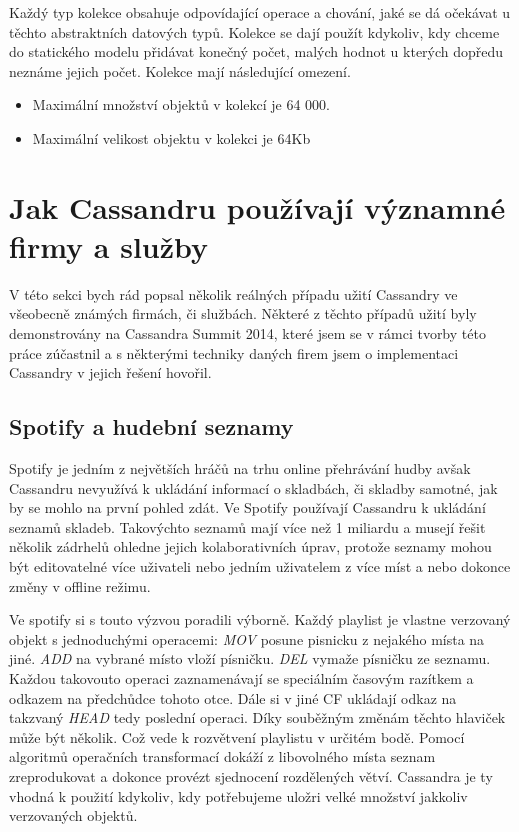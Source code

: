 \documentclass[thesis=M,czech]{FITthesis}[2012/06/26]
\begin{document}
Každý typ kolekce obsahuje odpovídající operace a  chování, jaké se dá očekávat u těchto abstraktních datových typů. Kolekce se dají použít kdykoliv, kdy chceme do statického modelu přidávat konečný počet, malých hodnot u kterých dopředu neznáme jejich počet. Kolekce mají následující omezení. 

\begin{itemize}
\item Maximální množství objektů v kolekcí je 64 000.
\item Maximální velikost objektu v kolekci je 64Kb
\end{itemize}

\section{Jak Cassandru používají významné firmy a služby}

V této sekci bych rád popsal několik reálných případu užití Cassandry ve všeobecně známých firmách, či službách. Některé z těchto případů užití byly demonstrovány na Cassandra Summit 2014, které jsem se v rámci tvorby této práce zúčastnil a s některými techniky daných firem jsem o implementaci Cassandry v jejich řešení hovořil. 

\subsection{Spotify a hudební seznamy}
Spotify je jedním z největších hráčů na trhu online přehrávání hudby avšak Cassandru nevyužívá k ukládání informací o skladbách, či skladby samotné, jak by se mohlo na první pohled zdát. Ve Spotify používají Cassandru k ukládání seznamů skladeb. Takovýchto seznamů mají více než 1 miliardu a musejí řešit několik zádrhelů ohledne jejich kolaborativních úprav, protože seznamy mohou být editovatelné více uživateli nebo jedním uživatelem z více míst a nebo dokonce změny v offline režimu. 

Ve spotify si s touto výzvou poradili výborně. Každý playlist je vlastne verzovaný objekt s jednoduchými operacemi: \emph{MOV} posune pisnicku z nejakého místa na jiné. \emph{ADD} na vybrané místo vloží písničku. \emph{DEL} vymaže písničku ze seznamu. Každou takovouto operaci zaznamenávají se speciálním časovým razítkem a odkazem na předchůdce tohoto otce. Dále si v jiné CF ukládají odkaz na takzvaný \emph{HEAD} tedy poslední operaci. Díky souběžným změnám těchto hlaviček může být několik. Což vede k rozvětvení playlistu v určitém bodě. Pomocí algoritmů operačních transformací dokáží z libovolného místa seznam zreprodukovat a dokonce provézt sjednocení rozdělených větví. Cassandra je ty vhodná k použití kdykoliv, kdy potřebujeme uložri velké množství jakkoliv verzovaných objektů. 
\end{document}
